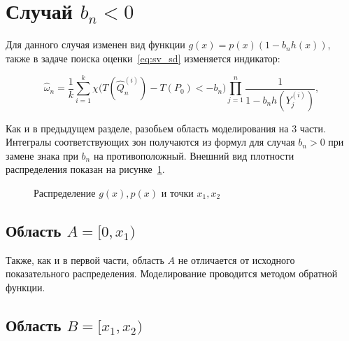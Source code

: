 \documentclass[12pt, specialist, subf, substylefile = spbu.rtx]{disser}
\begin{document}

\section{Случай $b_n < 0$}

Для данного случая изменен вид функции $g(x) = p(x)(1-b_n h(x))$, также 
в задаче поиска оценки~\eqref{eq:sv_sd} изменяется индикатор:

\begin{equation}\label{eq:est_minus}
\hat{\omega}_n=\frac{1}{k} \sum\limits_{i=1}^{k}
\chi \big(T(\hat{Q}^{(i)}_n)-T(P_0) < -b_n\big)
\prod\limits_{j=1}^{n} 
\frac{1}{1-b_nh(Y_j^{(i)})},
\end{equation}


Как и в предыдущем разделе, разобьем область моделирования на 3 части. Интегралы соответствующих зон получаются из формул для случая $b_n>0$ при замене знака при $b_n$ на противоположный. Внешний вид плотности распределения показан на рисунке~\ref{ris:plot2}. 

\begin{figure}[h]
\caption{Распределение $g(x), p(x)$ и точки $x_1, x_2$}
\label{ris:plot2}
\end{figure}


\subsection{Область $A=[0, x_1)$}

Также, как и в первой части, область $A$ не отличается от исходного показательного распределения. Моделирование проводится методом обратной функции.


\subsection{Область $B=[x_1, x_2)$}
\end{document}
